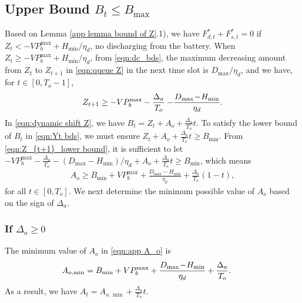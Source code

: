 \documentclass[journal]{IEEEtran}
\begin{document}
\subsection{Upper Bound  $B_t\leq B_{\max}$}
Based on Lemma \ref{app lemma bound of Z}.1), we have $F^*_{d,t}+F^*_{s,t}=0$ if $Z_t<-VP_{b}^{\max}+ H_{\min}/\eta_d$, no discharging from the battery.
When $Z_t\geq -VP_{b}^{\max}+H_{\min}/\eta_d$, from \eqref{eqn:dc_bds},  the maximum decreasing amount  from $Z_t$ to $Z_{t+1}$ in \eqref{eqn:queue Z} in the next time slot is $D_{\max}/\eta_d$, and we have, for $t\in [0,T_o-1]$,
\begin{align}\label{eqn:Z_{t+1}_lower bound}
Z_{t+1}\geq -VP_{b}^{\max}-\frac{\Delta_a}{T_o}-\!\frac{D_{\max}\!-\!H_{\min}}{\eta_d}.
\end{align}
In \eqref{eqn:dynamic shift Z}, we have $B_t=Z_t+A_o+\frac{\Delta_a}{T_o}t$. To satisfy the lower bound of $B_t$ in \eqref{eqn:Yt bds}, we must ensure $Z_t+A_o+\frac{\Delta_a}{T_o}t\geq B_{\min}$. From \eqref{eqn:Z_{t+1}_lower bound}, it is sufficient  to let
$-VP_{b}^{\max}-\frac{\Delta_a}{T_o}-(D_{\max}-H_{\min})/\eta_d+A_o+\frac{\Delta_a}{T_o}t\geq B_{\min}$,
which means
\begin{align}\label{eqn:app A_o}
A_o\geq  B_{\min}+VP_{b}^{\max}\!+\!\frac{D_{\max}\!-\!H_{\min}}{\eta_d}+\frac{\Delta_a}{T_o}(1-t),
\end{align}
for all  $t\in [0, T_o]$.
We next determine the minimum possible value of $A_o$ based on the sign of $\Delta_a$.
\setcounter{subsubsection}{0}
\subsubsection{If $\Delta_a\geq0$} The minimum value of $A_o$ in \eqref{eqn:app A_o} is
\begin{align}\label{eqn:app A_o 1}
\hspace*{-.5em}A_{o,\min}&=B_{\min}+VP_{b}^{\max}+\frac{D_{\max}\!-\!H_{\min}}{\eta_d}+\frac{\Delta_a}{T_o}.
\end{align}
As a result, we have $A_t=A_{o,\min}+\frac{\Delta_a}{T_o}t$.
\end{document}
